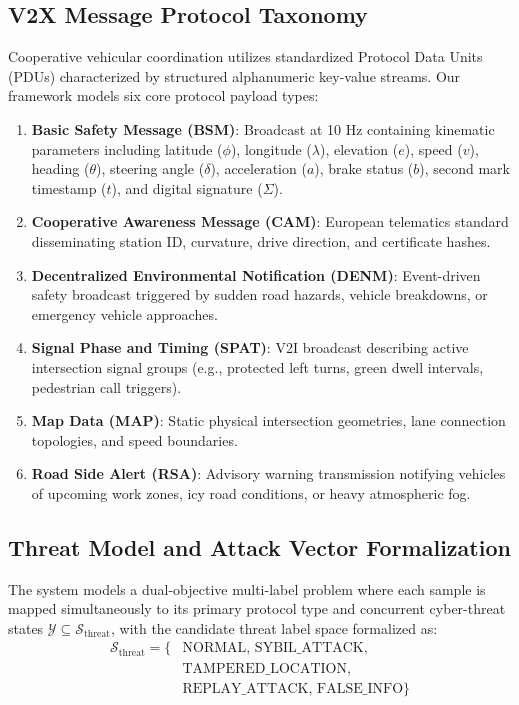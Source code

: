 \documentclass[conference]{IEEEtran}
\begin{document}
\subsection{V2X Message Protocol Taxonomy}
Cooperative vehicular coordination utilizes standardized Protocol Data Units (PDUs) characterized by structured alphanumeric key-value streams. Our framework models six core protocol payload types:
\begin{enumerate}
    \item \textbf{Basic Safety Message (BSM)}: Broadcast at 10 Hz containing kinematic parameters including latitude ($\phi$), longitude ($\lambda$), elevation ($e$), speed ($v$), heading ($\theta$), steering angle ($\delta$), acceleration ($a$), brake status ($b$), second mark timestamp ($t$), and digital signature ($\Sigma$).
    \item \textbf{Cooperative Awareness Message (CAM)}: European telematics standard disseminating station ID, curvature, drive direction, and certificate hashes.
    \item \textbf{Decentralized Environmental Notification (DENM)}: Event-driven safety broadcast triggered by sudden road hazards, vehicle breakdowns, or emergency vehicle approaches.
    \item \textbf{Signal Phase and Timing (SPAT)}: V2I broadcast describing active intersection signal groups (e.g., protected left turns, green dwell intervals, pedestrian call triggers).
    \item \textbf{Map Data (MAP)}: Static physical intersection geometries, lane connection topologies, and speed boundaries.
    \item \textbf{Road Side Alert (RSA)}: Advisory warning transmission notifying vehicles of upcoming work zones, icy road conditions, or heavy atmospheric fog.
\end{enumerate}

\subsection{Threat Model and Attack Vector Formalization}
The system models a dual-objective multi-label problem where each sample is mapped simultaneously to its primary protocol type and concurrent cyber-threat states $\mathcal{Y} \subseteq \mathcal{S}_{\text{threat}}$, with the candidate threat label space formalized as:
\begin{equation}
\begin{split}
\mathcal{S}_{\text{threat}} = \{ &\text{NORMAL}, \, \text{SYBIL\_ATTACK}, \\
                                 &\text{TAMPERED\_LOCATION}, \\
                                 &\text{REPLAY\_ATTACK}, \, \text{FALSE\_INFO} \}
\end{split}
\end{equation}
\end{document}
